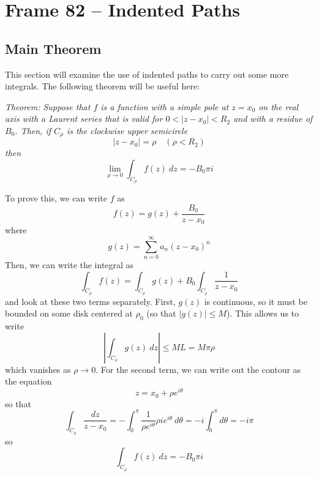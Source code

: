 \documentclass{article}
\begin{document}
\clearpage
\section{Frame 82 -- Indented Paths}
\subsection{Main Theorem}
This section will examine the use of indented paths to carry out some more integrals. The following theorem will be useful here:

\textit{Theorem: Suppose that $f$ is a function with a simple pole at $z = x_0$ on the real axis with a Laurent series that is valid for $0 < |z - x_0| < R_2$ and with a residue of $B_0$. Then, if $C_\rho$ is the clockwise upper semicircle
\[
	|z - x_0| = \rho	\quad	(\rho < R_2)
\]
then
\[
	\lim_{\rho \to 0} \int_{C_\rho} f(z)~dz = -B_0 \pi i
\]}

To prove this, we can write $f$ as
\[
	f(z) = g(z) + \frac{B_0}{z - x_0}
\]
where
\[
	g(z) = \sum_{n=0}^\infty a_n (z - x_0)^n
\]
Then, we can write the integral as
\[
	\int_{C_\rho} f(z) = \int_{C_\rho} g(z) + B_0 \int_{C_\rho} \frac{1}{z - x_0}
\]
and look at these two terms separately. First, $g(z)$ is continuous, so it must be bounded on some disk centered at $\rho_0$ (so that $|g(z)| \le M$). This allows us to write
\[
	\left| \int_{C_\rho} g(z)~dz \right|
	\le ML
	= M \pi \rho
\]
which vanishes as $\rho \to 0$. For the second term, we can write out the contour as the equation
\[
	z = x_0 + \rho e^{i\theta}
\]
so that
\[
	\int_{C_\rho} \frac{dz}{z - x_0}
	= -\int_0^\pi \frac{1}{\rho e^{i\theta}} \rho i e^{i\theta}~d\theta
	= -i \int_0^\pi d\theta
	= -i\pi
\]
so
\[
	\int_{C_\rho} f(z)~dz = -B_0 \pi i
\]
\end{document}
